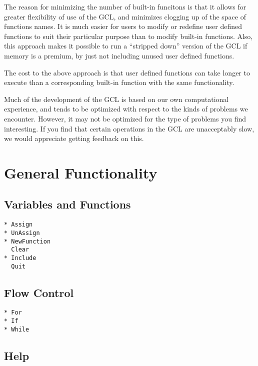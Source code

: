 The reason for minimizing the number of built-in funcitons is that it
allows for greater flexibility of use of the GCL, and minimizes
clogging up of the space of functions names.  It is much easier for
users to modify or redefine user defined functions to suit their
particular purpose than to modify built-in functions.  Also, this
approach makes it possible to run a ``stripped down'' version of the
GCL if memory is a premium, by just not including unused user defined
functions.

The cost to the above approach is that user defined functions can take
longer to execute than a corresponding built-in function with the same
functionality.

Much of the development of the GCL is based on our own computational
experience, and tends to be optimized with respect to the kinds of
problems we encounter.  However, it may not be optimized
for the type of problems you find interesting.  If you find that
certain operations in the GCL are unacceptably slow, we would
appreciate getting feedback on this.

\section{General Functionality}

\subsection{Variables and Functions}

\begin{multicols}{3}
\begin{verbatim}
* Assign 
* UnAssign 
* NewFunction
  Clear 
* Include
  Quit
\end{verbatim}
\end{multicols}

\subsection{Flow Control}

\begin{multicols}{3}
\begin{verbatim}
* For
* If
* While
\end{verbatim}
\end{multicols}

\subsection{Help}

